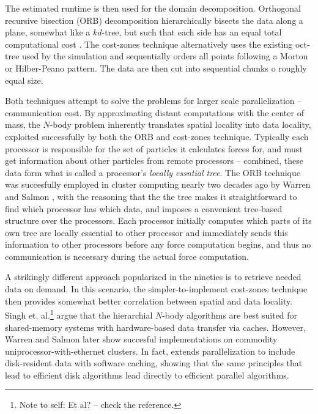 \documentclass[times, leqno,twocolumn]{article}
\newcommand{\authornote}[1]{\footnote{Note to self: #1}}
\begin{document}
The estimated runtime is then used for the domain decomposition.
Orthogonal recursive bisection (ORB) decomposition hierarchically bisects the data along a plane, somewhat like a $kd$-tree, but such that each side has an equal total computational cost \cite{singh95load, liu94experiences, salmon93parallel}.
The cost-zones technique alternatively uses the existing oct-tree used by the simulation and sequentially orders all points following a Morton or Hilber-Peano pattern.
The data are then cut into sequential chunks o roughly equal size.

Both techniques attempt to solve the problems for larger scale parallelization -- communication cost.
By approximating distant computations with the center of mass, the $N$-body problem inherently translates spatial locality into data locality, exploited successfully by both the ORB and cost-zones technique.
Typically each processor is responsible for the set of particles it calculates forces for, and must get information about other particles from remote processors -- combined, these data form what is called a processor's {\it locally essntial tree}.
The ORB technique was succesfully employed in cluster computing nearly two decades ago by Warren and Salmon \cite{warren92astrophysical}, with the reasoning that the the tree makes it straightforward to find which processor has which data, and imposes a convenient tree-based structure over the processors.
Each processor initially computes which parts of its own tree are locally essential to other processor and immediately sends this information to other processors before any force computation begins, and thus no communication is necessary during the actual force computation.

A strikingly different approach popularized in the nineties is to retrieve needed data on demand.
In this scenario, the simpler-to-implement cost-zones technique then provides somewhat better correlation between spatial and data locality.
Singh et. al.\authornote{Et al? -- check the reference.} \cite{singh95load, singh_architecture} argue that the hierarchial $N$-body algorithms are best suited for shared-memory systems with hardware-based data transfer via caches.
However, Warren and Salmon later \cite{warren93,warren97} show succesful implementations on commodity uniprocessor-with-ethernet clusters.
In fact, \cite{warren97} extends parallelization to include disk-resident data with software caching, showing that the same principles that lead to efficient disk algorithms lead directly to efficient parallel algorithms.
\end{document}
